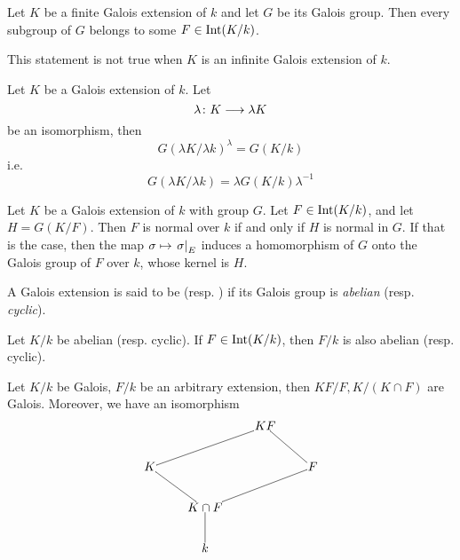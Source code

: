   \begin{cor}
    Let $K$ be a finite Galois extension of $k$ and let $G$ be its Galois group. Then every subgroup of $G$ belongs to some $F\in\operatorname{Int}(K/k)$.
  \end{cor}
  \begin{warn}
    This statement is not true when $K$ is an infinite Galois extension of $k$.
  \end{warn}

  \begin{lem}
    Let $K$ be a Galois extension of $k$. Let
    \begin{equation*}
       \lambda\colon K\longrightarrow \lambda K
    \end{equation*}
    be an isomorphism, then
    \begin{equation*}
      G(\lambda K/\lambda k)^{\lambda}=G(K/k)
    \end{equation*}
    i.e.
    \begin{equation*}
      G(\lambda K/\lambda k)=\lambda G(K/k) \lambda^{-1}
    \end{equation*}
  \end{lem}

  \begin{thm}
    Let $K$ be a Galois extension of $k$ with group $G$. Let $F\in\operatorname{Int}(K/k)$, and let $H=G(K/F)$. Then $F$ is normal over $k$ if and only if $H$ is normal in $G$. If that is the case, then the map $\sigma\mapsto\left.{\sigma}\right|_{E}$ induces a homomorphism of $G$ onto the Galois group of $F$ over $k$, whose kernel is $H$.
  \end{thm}

  \begin{defn}
    A Galois extension is said to be  (resp. ) if its Galois group is \emph{abelian} (resp. \emph{cyclic}).
  \end{defn}

  \begin{cor}
    Let $K/k$ be abelian (resp. cyclic). If $F\in\operatorname{Int}(K/k)$, then $F/k$ is also abelian (resp. cyclic).
  \end{cor}

  \begin{thm}
    Let $K/k$ be Galois, $F/k$ be an arbitrary extension, then $KF/F, K/(K\cap F)$ are Galois. Moreover, we have an isomorphism
                 \begin{displaymath}
                   \xymatrix@1{
                      && KF\ar@{-}[dr] &\\
                      K\ar@{-}[urr] &&& F\ar@{-}[dll] \\
                      & K\cap F\ar@{-}[ul] &&\\
                      & k\ar@{-}[u] &&            }
                 \end{displaymath}
  \end{thm}

